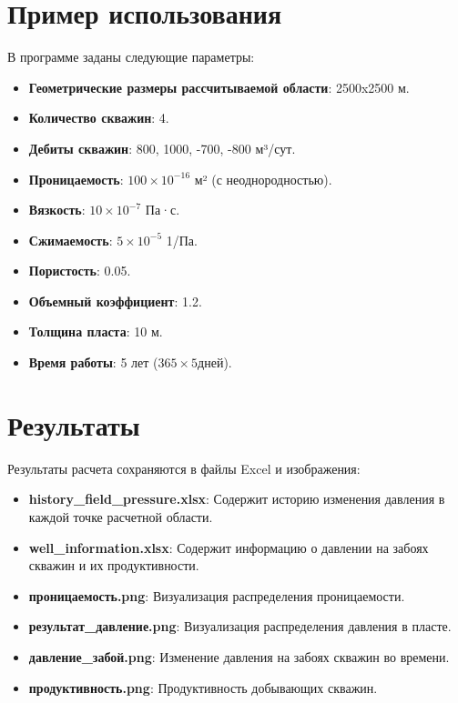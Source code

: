 \documentclass{article}
\begin{document}
\section{Пример использования}

В программе заданы следующие параметры:

\begin{itemize}
    \item \textbf{Геометрические размеры рассчитываемой области}: 2500x2500 м.
    \item \textbf{Количество скважин}: 4.
    \item \textbf{Дебиты скважин}: 800, 1000, -700, -800 м³/сут.
    \item \textbf{Проницаемость}: $100 \times 10^{-16}$ м² (с неоднородностью).
    \item \textbf{Вязкость}: $10 \times 10^{-7}$ Па·с.
    \item \textbf{Сжимаемость}: $5 \times 10^{-5}$ 1/Па.
    \item \textbf{Пористость}: 0.05.
    \item \textbf{Объемный коэффициент}: 1.2.
    \item \textbf{Толщина пласта}: 10 м.
    \item \textbf{Время работы}: 5 лет ($365 \times 5 $дней).
\end{itemize}

\section{Результаты}

Результаты расчета сохраняются в файлы Excel и изображения:

\begin{itemize}
    \item \textbf{history\_field\_pressure.xlsx}: Содержит историю изменения давления в каждой точке расчетной области.
    \item \textbf{well\_information.xlsx}: Содержит информацию о давлении на забоях скважин и их продуктивности.
    \item \textbf{проницаемость.png}: Визуализация распределения проницаемости.
    \item \textbf{результат\_давление.png}: Визуализация распределения давления в пласте.
    \item \textbf{давление\_забой.png}: Изменение давления на забоях скважин во времени.
    \item \textbf{продуктивность.png}: Продуктивность добывающих скважин.
\end{itemize}
\end{document}
